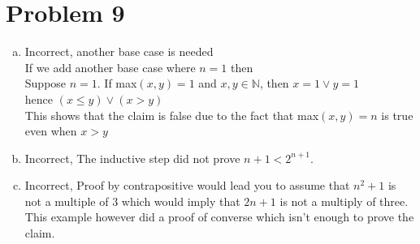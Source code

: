 \documentclass[11pt,letterpaper]{article}
\begin{document}
\section*{Problem 9}
\begin{enumerate}[(a)]
\item
Incorrect, another base case is needed\\
If we add another base case where $n=1$ then\\
Suppose $n=1$. If max$(x,y) =1$ and $x,y\in\mathbb{N}$, then $x=1 \vee y=1$ \\
hence $(x\leq y)\vee(x>y)$\\
This shows that the claim is false due to the fact that max$(x,y)=n$ is true even when $x>y$\\
\item
Incorrect, The inductive step did not prove $n+1<2^{n+1}$.
\item
Incorrect, Proof by contrapositive would lead you to assume that $n^2 + 1$ is not a multiple of 3 which would imply that $2n+1$ is not a multiply of three. This example however did a proof of converse which isn't enough to prove the claim.\\
\end{enumerate}
\end{document}
